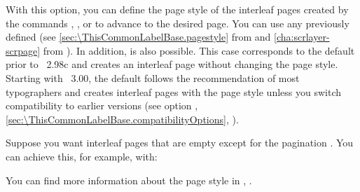 \begin{Declaration}
\end{Declaration}%
With this option, you can define the page style of the interleaf pages created by the commands
,
, or
 to advance to the desired page.
You can use any previously defined  (see
\autoref{sec:\ThisCommonLabelBase.pagestyle} from
 and
\autoref{cha:scrlayer-scrpage} from ).
In addition,  is also possible.
This case corresponds to the default prior to \KOMAScript~2.98c and creates an
interleaf page without changing the page style. Starting with
\KOMAScript~3.00, the default follows the recommendation of most
typographers and creates interleaf pages with the
page style unless you switch compatibility to earlier \KOMAScript{} versions
(see option %
,
\autoref{sec:\ThisCommonLabelBase.compatibilityOptions},
).
  \begin{Example}
    Suppose you want interleaf pages that are empty except for the pagination%
    . You can achieve this,
    for example, with:
\begin{lstcode}
\end{lstcode}
    You can find more information about the
    page style in ,
    .
  \end{Example}
